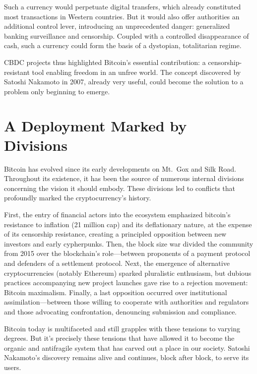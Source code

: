\documentclass[
  a5paper,
  smalldemyvopaper,10pt,twoside,onecolumn,openright,extrafontsizes,hidelinks]{memoir}
\begin{document}
Such a currency would perpetuate digital transfers, which already
constituted most transactions in Western countries. But it would also
offer authorities an additional control lever, introducing an
unprecedented danger: generalized banking surveillance and censorship.
Coupled with a controlled disappearance of cash, such a currency could
form the basis of a dystopian, totalitarian regime.

CBDC projects thus highlighted Bitcoin's essential contribution: a
censorship-resistant tool enabling freedom in an unfree world. The
concept discovered by Satoshi Nakamoto in 2007, already very useful,
could become the solution to a problem only beginning to emerge.

\section*{A Deployment Marked by
Divisions}\label{un-duxe9ploiement-fait-de-divisions}


Bitcoin has evolved since its early developments on Mt.~Gox and Silk
Road. Throughout its existence, it has been the source of numerous
internal divisions concerning the vision it should embody. These
divisions led to conflicts that profoundly marked the cryptocurrency's
history.

First, the entry of financial actors into the ecosystem emphasized
bitcoin's resistance to inflation (21 million cap) and its deflationary
nature, at the expense of its censorship resistance, creating a
principled opposition between new investors and early cypherpunks. Then,
the block size war divided the community from 2015 over the blockchain's
role---between proponents of a payment protocol and defenders of a
settlement protocol. Next, the emergence of alternative cryptocurrencies
(notably Ethereum) sparked pluralistic enthusiasm, but dubious practices
accompanying new project launches gave rise to a rejection movement:
Bitcoin maximalism. Finally, a last opposition occurred over
institutional assimilation---between those willing to cooperate with
authorities and regulators and those advocating confrontation,
denouncing submission and compliance.

Bitcoin today is multifaceted and still grapples with these tensions to
varying degrees. But it's precisely these tensions that have allowed it
to become the organic and antifragile system that has carved out a place
in our society. Satoshi Nakamoto's discovery remains alive and
continues, block after block, to serve its users.
\end{document}
